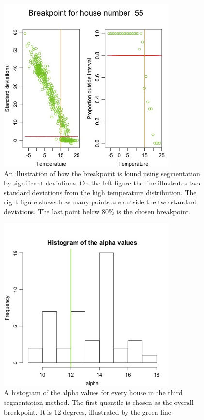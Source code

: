 \begin{figure}
    \centering
    \includegraphics[width=0.8\textwidth]{../../../figures/Breakpoint.jpeg}
    \caption{An illustration of how the breakpoint is found using segmentation by significant deviations. On the left figure the line illustrates two standard deviations from the high temperature distribution.
    The right figure shows how many points are outside the two standard deviations. The last point below 80\% is the chosen breakpoint.}
    \label{fig: Breakpoint}
\end{figure}

\begin{figure}
    \centering
    \includegraphics[width=0.8\textwidth]{../../../figures/AlphaHist.jpeg}
    \caption{A histogram of the alpha values for every house in the third segmentation method. The first quantile is chosen as the overall breakpoint. It is 12 degrees, illustrated by the green line}
    \label{fig: AlphaHist}
\end{figure}


